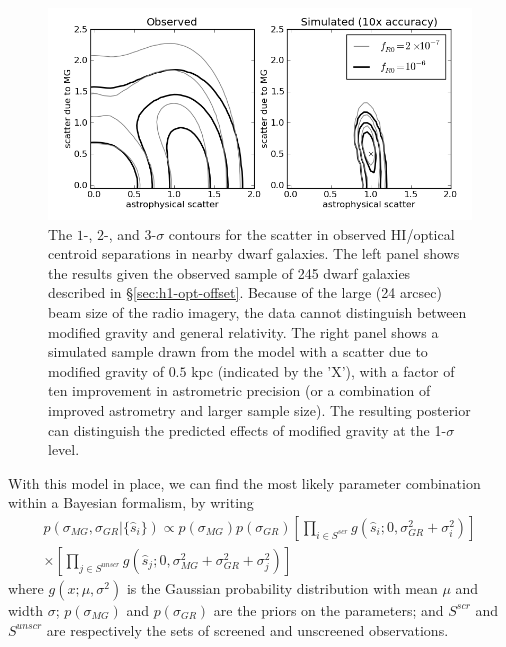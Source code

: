 \documentclass[useAMS,usenatbib,twocolumn]{mn2e}
\begin{document}
\begin{figure}
\centering
\includegraphics[scale=0.7]{figures/Offset_HI_optical_jake.png}
\caption{The $1$-, $2$-, and $3$-$\sigma$ contours for the scatter in observed
  HI/optical centroid separations in nearby dwarf galaxies.  The left panel
  shows the results given the observed sample of 245 dwarf galaxies described
  in \S\ref{sec:h1-opt-offset}.  Because of the large (24 arcsec) beam size of
  the radio imagery, the data cannot distinguish between modified gravity and
  general relativity.  The right panel shows a simulated sample drawn from the
  model with a scatter due to modified gravity of $0.5$ kpc (indicated by the
'X'), %
  with a factor of ten improvement in astrometric precision (or a combination of improved astrometry and larger sample size).  The resulting
  posterior can distinguish the predicted effects of modified gravity at the
  1-$\sigma$ level.}
\label{fig:offset-analysis}
\end{figure}

With this model in place, we can find the most likely parameter combination
within a Bayesian formalism, by writing
\begin{equation}
\begin{split}
  \label{eq:separation_likelihood}
  p(\sigma_{MG}, \sigma_{GR}|\{\hat{s}_i\})
  \propto p(\sigma_{MG})p(\sigma_{GR})
  \left[ \prod_{i \in S^{scr}} g(\hat{s}_i;0, \sigma_{GR}^2 +
\sigma_i^2)\right]\\
\times
  \left[ \prod_{j \in S^{unscr}} g(\hat{s}_j;0, \sigma_{MG}^2 +
\sigma_{GR}^2 + \sigma_j^2)\right]
\end{split}
\end{equation}
where $g(x;\mu,\sigma^2)$ is the Gaussian probability distribution with
mean $\mu$ and width $\sigma$; $p(\sigma_{MG})$ and $p(\sigma_{GR})$ are the
priors on the parameters; and $S^{scr}$ and $S^{unscr}$ are respectively the
sets of screened and unscreened observations.
\end{document}
